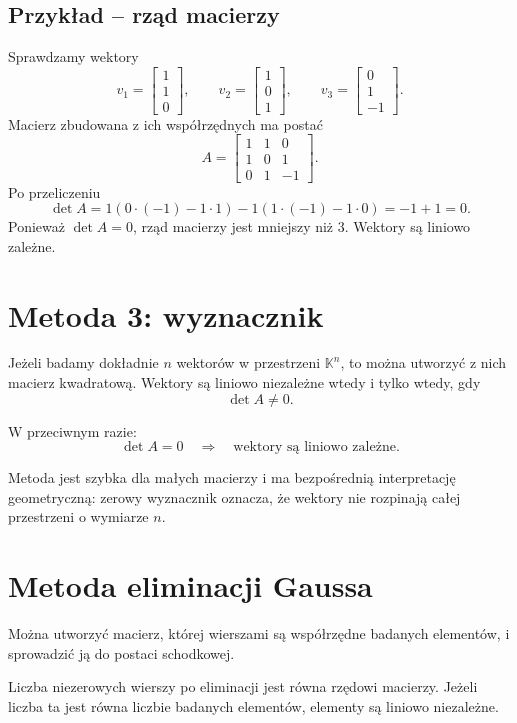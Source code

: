\documentclass{article}
\begin{document}
\subsection{Przykład -- rząd macierzy}
Sprawdzamy wektory
\[
v_1=\begin{bmatrix}1\\1\\0\end{bmatrix},
\qquad
v_2=\begin{bmatrix}1\\0\\1\end{bmatrix},
\qquad
v_3=\begin{bmatrix}0\\1\\-1\end{bmatrix}.
\]
Macierz zbudowana z ich współrzędnych ma postać
\[
A=
\begin{bmatrix}
1&1&0\\
1&0&1\\
0&1&-1
\end{bmatrix}.
\]
Po przeliczeniu
\[
\det A
=
1(0\cdot(-1)-1\cdot1)
-1(1\cdot(-1)-1\cdot0)
=-1+1=0.
\]
Ponieważ $\det A=0$, rząd macierzy jest mniejszy niż $3$. Wektory są liniowo zależne.

\section{Metoda 3: wyznacznik}

Jeżeli badamy dokładnie $n$ wektorów w przestrzeni $\mathbb K^n$, to można utworzyć z nich macierz kwadratową. Wektory są liniowo niezależne wtedy i tylko wtedy, gdy
\[
\det A\neq0.
\]

W przeciwnym razie:
\[
\det A=0
\quad\Longrightarrow\quad
\text{wektory są liniowo zależne}.
\]

Metoda jest szybka dla małych macierzy i ma bezpośrednią interpretację geometryczną: zerowy wyznacznik oznacza, że wektory nie rozpinają całej przestrzeni o wymiarze $n$.

\section{Metoda eliminacji Gaussa}

Można utworzyć macierz, której wierszami są współrzędne badanych elementów, i sprowadzić ją do postaci schodkowej.

Liczba niezerowych wierszy po eliminacji jest równa rzędowi macierzy. Jeżeli liczba ta jest równa liczbie badanych elementów, elementy są liniowo niezależne.
\end{document}
